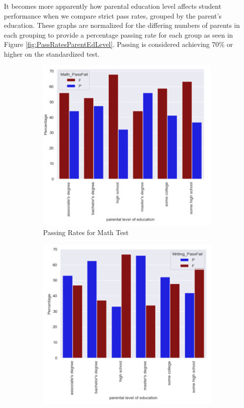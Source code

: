 \documentclass[doc]{apa6} %
\begin{document}
It becomes more apparently how parental education level affects student performance when we compare strict pass rates, grouped by the parent's education. These graphs are normalized for the differing numbers of parents in each grouping to provide a percentage passing rate for each group as seen in Figure \ref{fig:PassRatesParentEdLevel}.  Passing is considered achieving 70\% or higher on the standardized test.

\begin{figure}[H]
    \centering
    \caption{Correlations of Parent Education to Student Pass Rates}
    \begin{subfigure}[b]{0.28\textwidth}
    \includegraphics[width=\linewidth]{MathPFBarGraph.png}
    \caption{Passing Rates for Math Test}
    \label{fig:math}
    \end{subfigure}
    \begin{subfigure}[b]{0.28\textwidth}
    \includegraphics[width=\linewidth]{WritingPFBarGraph.png}

\end{subfigure}
\end{figure}
\end{document}
